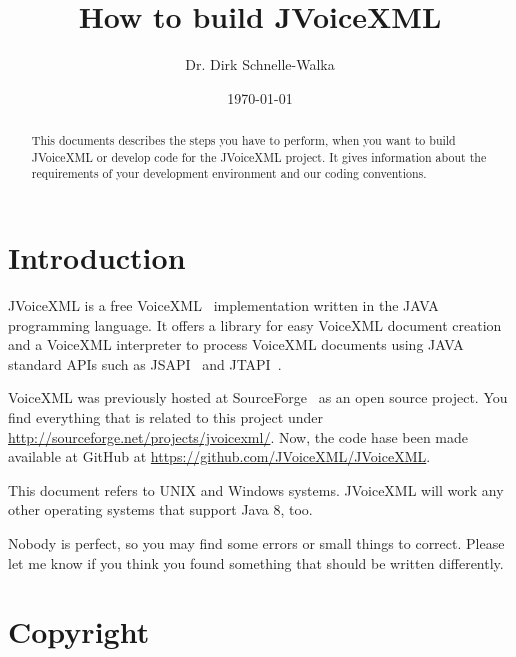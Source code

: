 \documentclass[11pt,a4paper]{article}
\title{How to build JVoiceXML \jvxmlversion}
\author{Dr. Dirk Schnelle-Walka}
\date{\today}
\begin{document}
\pagestyle{empty}

\maketitle

\pagestyle{headings}

\tableofcontents

\newpage

\begin{abstract}
This documents describes the steps you have to perform, when you want
to build JVoiceXML or develop code for the JVoiceXML project. It gives
information about the requirements of your development environment 
and our coding conventions.
\end{abstract}

\section{Introduction}
\label{sec:introduction}

JVoiceXML is a free VoiceXML~\cite{w3.org:voicexml} implementation written in 
the JAVA programming language. It offers a library for easy VoiceXML
document creation and a VoiceXML interpreter to process 
VoiceXML documents using JAVA standard APIs such as JSAPI~\cite{sun:jsapi} and
JTAPI~\cite{sun:jsapi}.

VoiceXML was previously hosted at SourceForge~\cite{sourceforge} as an open source project.
You find everything that is related to this project under
\url{http://sourceforge.net/projects/jvoicexml/}. Now, the code hase been made
available at GitHub at \url{https://github.com/JVoiceXML/JVoiceXML}.

This document refers to UNIX and Windows systems. JVoiceXML will work 
any other operating systems that support Java 8, too.

Nobody is perfect, so you may find some errors or small things to correct.
Please let me know if you think you found something that should be written
differently.

\section{Copyright}
\label{sec:copyright}
\end{document}
